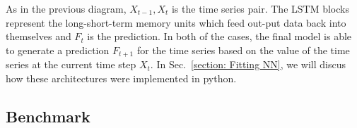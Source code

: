 \documentclass[10pt,a4paper]{article}
\begin{document}
As in the previous diagram, ${X_{t-1},X_{t}}$ is the time series pair. The LSTM blocks represent the long-short-term memory units which feed out-put data back into themselves and $F_{t}$ is the prediction. In both of the cases, the final model is able to generate a prediction $F_{t+1}$ for the time series based on the value of the time series at the current time step $X_{t}$. In Sec.~\ref{section: Fitting NN}, we will discus how these architectures were implemented in python.


\subsection{Benchmark}

%
%
\end{document}
